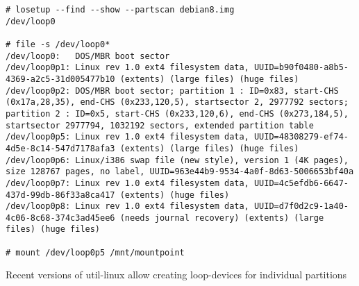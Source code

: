 


\begin{frame}[fragile]
    \begin{listing}[H]
        \begin{verbatim}
# losetup --find --show --partscan debian8.img
/dev/loop0

# file -s /dev/loop0*
/dev/loop0:   DOS/MBR boot sector
/dev/loop0p1: Linux rev 1.0 ext4 filesystem data, UUID=b90f0480-a8b5-4369-a2c5-31d005477b10 (extents) (large files) (huge files)
/dev/loop0p2: DOS/MBR boot sector; partition 1 : ID=0x83, start-CHS (0x17a,28,35), end-CHS (0x233,120,5), startsector 2, 2977792 sectors; partition 2 : ID=0x5, start-CHS (0x233,120,6), end-CHS (0x273,184,5), startsector 2977794, 1032192 sectors, extended partition table
/dev/loop0p5: Linux rev 1.0 ext4 filesystem data, UUID=48308279-ef74-4d5e-8c14-547d7178afa3 (extents) (large files) (huge files)
/dev/loop0p6: Linux/i386 swap file (new style), version 1 (4K pages), size 128767 pages, no label, UUID=963e44b9-9534-4a0f-8d63-5006653bf40a
/dev/loop0p7: Linux rev 1.0 ext4 filesystem data, UUID=4c5efdb6-6647-437d-99db-86f33a8ca417 (extents) (huge files)
/dev/loop0p8: Linux rev 1.0 ext4 filesystem data, UUID=d7f0d2c9-1a40-4c06-8c68-374c3ad45ee6 (needs journal recovery) (extents) (large files) (huge files)

# mount /dev/loop0p5 /mnt/mountpoint
        \end{verbatim}
    
        \caption{Recent versions of util-linux allow creating loop-devices for individual partitions}

        \label{lst:mount_loop}
    \end{listing}
    
\note{
    \begin{itemize}
        \item Mounting images without partition table (filesystem images)%
        \item If the loop-/sys/module/loop/parameters/max\_part
        \item Older versions of util-linux do not support the --partscan-parameter which will instruct the kernel to read the partition table. The partprobe-command from libparted can be a replacement in this case. On kernels older than 3.2, the loop module has to be loaded with a non-zero max\_part parameter.
        https://git.kernel.org/cgit/utils/util-linux/util-linux.git/commit/?id=59d749c33136b85fc4a51a0af6c48cc97e3d1b31
    \end{itemize}
}



\end{frame}


